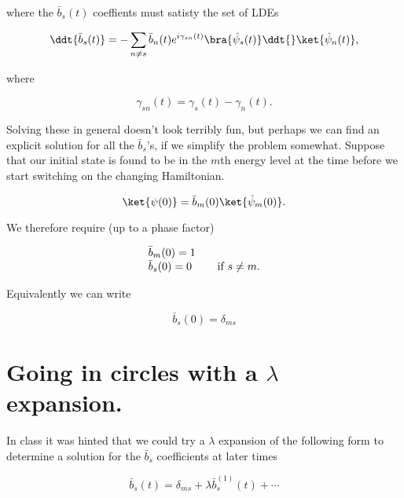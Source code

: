 where the $\bar{b}_s(t)$ coeffients must satisty the set of LDEs 

\begin{equation}\label{eqn:adiabaticApprox:50}
\ddt{\bar{b}_s(t)} = - \sum_{n \ne s} \bar{b}_n(t) e^{i \gamma_{sn}(t) } \bra{\hat{\psi}_s(t)} \ddt{} \ket{\hat{\psi}_n(t)},
\end{equation}

where

\begin{equation}\label{eqn:adiabaticApprox:70}
\gamma_{sn}(t) = \gamma_{s}(t) - \gamma_{n}(t).
\end{equation}

Solving these in general doesn't look terribly fun, but perhaps we can find an explicit solution for all the $\bar{b}_s$'s, if we simplify the problem somewhat.  Suppose that our initial state is found to be in the $m$th energy level at the time before we start switching on the changing Hamiltonian.

\begin{equation}\label{eqn:adiabaticApprox:90}
\ket{\psi(0)} = \bar{b}_m(0) \ket{\hat{\psi}_m(0)}.
\end{equation}

We therefore require (up to a phase factor)

\begin{equation}\label{eqn:adiabaticApprox:110}
\begin{array}{l l}
\bar{b}_m(0) = 1 & \\
\bar{b}_s(0) = 0 & \quad \mbox{if $s \ne m$}.
\end{array}
\end{equation}

Equivalently we can write

\begin{equation}\label{eqn:adiabaticApprox:130}
\bar{b}_s(0) = \delta_{ms}
\end{equation}

\section{Going in circles with a $\lambda$ expansion.}

In class it was hinted that we could try a $\lambda$ expansion of the following form to determine a solution for the $\bar{b}_s$ coefficients at later times

\begin{equation}\label{eqn:adiabaticApprox:150}
\bar{b}_s(t) = \delta_{ms} + \lambda \bar{b}^{(1)}_s(t) + \cdots
\end{equation}

